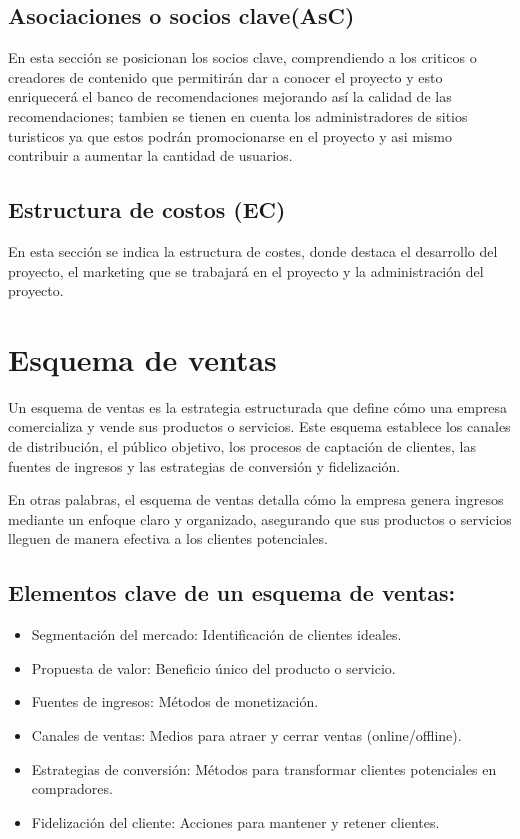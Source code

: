 \subsection{Asociaciones o socios clave(AsC)}
En esta sección se posicionan los socios clave, comprendiendo a los criticos o creadores de contenido que permitirán dar a conocer el proyecto y esto enriquecerá el banco de recomendaciones mejorando así la calidad de las recomendaciones; tambien se tienen en cuenta los administradores de sitios turisticos ya que estos podrán promocionarse en el proyecto y asi mismo contribuir a aumentar la cantidad de usuarios.
\subsection{Estructura de costos (EC)}
En esta sección se indica la estructura de costes, donde destaca el desarrollo del proyecto, el marketing que se trabajará en el proyecto y la administración del proyecto.

\section{Esquema de ventas}
Un esquema de ventas es la estrategia estructurada que define cómo una empresa comercializa y vende sus productos o servicios. Este esquema establece los canales de distribución, el público objetivo, los procesos de captación de clientes, las fuentes de ingresos y las estrategias de conversión y fidelización.

En otras palabras, el esquema de ventas detalla cómo la empresa genera ingresos mediante un enfoque claro y organizado, asegurando que sus productos o servicios lleguen de manera efectiva a los clientes potenciales.

\subsection{Elementos clave de un esquema de ventas:}
\begin{itemize}
   \item Segmentación del mercado: Identificación de clientes ideales.

\item Propuesta de valor: Beneficio único del producto o servicio.

\item Fuentes de ingresos: Métodos de monetización.

\item Canales de ventas: Medios para atraer y cerrar ventas (online/offline).

\item Estrategias de conversión: Métodos para transformar clientes potenciales en compradores.

\item Fidelización del cliente: Acciones para mantener y retener clientes.
\end{itemize}


